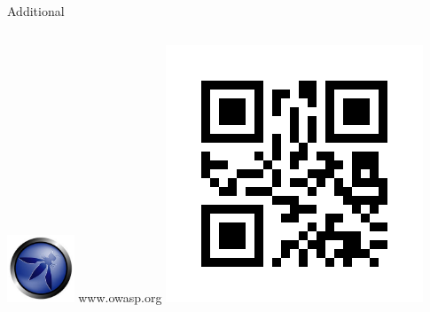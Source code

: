 \begin{frame}[fragile]{Additional}
\begin{columns}[t]
\begin{column}[T]{5cm}
            \begin{center}
              \includegraphics[width=2cm,keepaspectratio]{sources/images/owasp.jpg} \newline
              www.owasp.org \newline
              \includegraphics[width=\textwidth]{sources/images/owasp_qr.png}
             \end{center}
         \end{column}
     \end{columns}
\end{frame}
